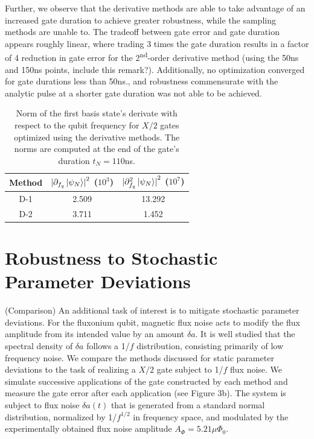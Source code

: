 \documentclass[
  amsfonts,
  amsmath,
  tbtags,
  amssymb,
  aps,
  nobibnotes,
  twocolumn,
  superscriptaddress,
]{revtex4-2}
\begin{document}
Further, we observe that the derivative methods are able
to take advantage of an increased gate duration to achieve greater robustness,
while the sampling methods are unable to. The tradeoff between gate error and
gate duration appears roughly linear, where trading 3 times the gate duration
results in a factor of 4 reduction in gate error for the 2\textsuperscript{nd}-order
derivative method (using the 50ns and 150ns points, include this remark?). Additionally,
no optimization converged for gate durations less than 50ns., and robustness commensurate
with the analytic pulse at a shorter gate duration was not able to be achieved.

\begin{table}
  \begin{tabular}{c | c | c}
    Method & ${\lvert \partial_{f_{q}} \ket{\psi_{N}} \rvert}^{2}$ ($10^{3}$)
    & ${\lvert \partial^{2}_{f_{q}} \ket{\psi_{N}} \rvert}^{2}$ ($10^{7}$)\\
    \hline
    D-1 & 2.509 & 13.292\\
    D-2 & 3.711 & 1.452\\
  \end{tabular}
  \caption{Norm of the first basis state's derivate with respect to the qubit frequency
    for $X/2$ gates optimized using the derivative methods. The norms are computed
    at the end of the gate's duration $t_{N} = 110$ns.}
\end{table}


\section{Robustness to Stochastic Parameter Deviations} %
(Comparison) An additional task of interest is to mitigate
stochastic parameter deviations. For the fluxonium qubit, magnetic flux noise
acts to modify the flux amplitude from its intended value by an amount $\delta a$.
It is well studied that the spectral density of $\delta a$ follows a
1/$f$ distribution, consisting primarily of low frequency noise. We compare
the methods discussed for static parameter deviations to the task of
realizing a $X/2$ gate subject to 1/$f$ flux noise. We simulate successive
applications of the gate constructed by each method and measure the gate error
after each application (see Figure 3b). The system is subject to flux noise
$\delta a (t)$ that is generated from a standard normal distribution, normalized
by 1/$f^{1/2}$ in frequency space, and modulated by the experimentally obtained
flux noise amplitude $A_{\Phi} = 5.21 \mu \Phi_{0}$.
\end{document}
